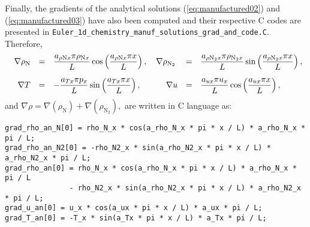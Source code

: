 \documentclass[10pt]{article}
\begin{document}
Finally, the gradients of the analytical solutions (\ref{eq:manufactured02}) and (\ref{eq:manufactured03}) have also been computed and their respective C codes are presented in  \texttt{Euler\_1d\_chemistry\_manuf\_solutions\_grad\_and\_code.C}. Therefore,
\begin{equation}
\begin{array}{rrlrl}
\nabla \rho_{\text{N}} &=&  \dfrac{ a_{ \rho \text{N} x} \pi \rho_{\text{N}x} }{L} \cos\left( \dfrac{ a_{\rho \text{N} x} \pi x }{L}\right),
\quad
\nabla \rho_{\text{N}_2} &=&  \dfrac{ a_{ \rho \text{N}_2 x} \pi \rho_{\text{N}_2 x} }{L} \sin\left( \dfrac{ a_{ \rho \text{N}_2 x} \pi x }{L}\right),\vspace{10pt}\\
\quad
%
\nabla T &=& - \dfrac{ a_{Tx} \pi p_x }{L} \sin\left( \dfrac{ a_{Tx} \pi x }{L}\right),
\quad\quad\quad
%
\nabla u &=& \dfrac{ a_{ux} \pi u_x}{L} \cos\left( \dfrac{ a_{ux} \pi x }{L}\right),
\end{array}
\end{equation}
and $\nabla \rho =\nabla \left( \rho_\text{N}\right) + \nabla \left(\rho_{\text{N}_2} \right),$ are written in C language as:





\begin{verbatim}
grad_rho_an_N[0] = rho_N_x * cos(a_rho_N_x * pi * x / L) * a_rho_N_x * pi / L;
grad_rho_an_N2[0] = -rho_N2_x * sin(a_rho_N2_x * pi * x / L) * a_rho_N2_x * pi / L;
grad_rho_an[0] = rho_N_x * cos(a_rho_N_x * pi * x / L) * a_rho_N_x * pi / L
               - rho_N2_x * sin(a_rho_N2_x * pi * x / L) * a_rho_N2_x * pi / L;
grad_u_an[0] = u_x * cos(a_ux * pi * x / L) * a_ux * pi / L;
grad_T_an[0] = -T_x * sin(a_Tx * pi * x / L) * a_Tx * pi / L;
\end{verbatim}



%
 

\end{document}
